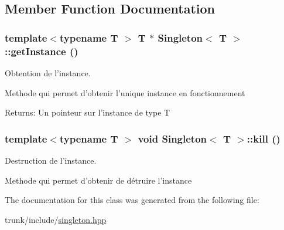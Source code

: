 \subsection{Member Function Documentation}
\hypertarget{classSingleton_c7b8bd773889a70952cd00654e43bbe8}{
\subsubsection[{getInstance}]{\setlength{\rightskip}{0pt plus 5cm}template$<$typename T $>$ T $\ast$ {\bf Singleton}$<$ T $>$::getInstance ()}}
\label{classSingleton_c7b8bd773889a70952cd00654e43bbe8}


Obtention de l'instance. 

Methode qui permet d'obtenir l'unique instance en fonctionnement

\begin{Desc}
\item[Returns:]Un pointeur sur l'instance de type T \end{Desc}
\hypertarget{classSingleton_a0372324492d74974b014b8d576737f3}{
\subsubsection[{kill}]{\setlength{\rightskip}{0pt plus 5cm}template$<$typename T $>$ void {\bf Singleton}$<$ T $>$::kill ()}}
\label{classSingleton_a0372324492d74974b014b8d576737f3}


Destruction de l'instance. 

Methode qui permet d'obtenir de détruire l'instance 

The documentation for this class was generated from the following file:\begin{CompactItemize}
\item 
trunk/include/\hyperlink{singleton_8hpp}{singleton.hpp}\end{CompactItemize}
